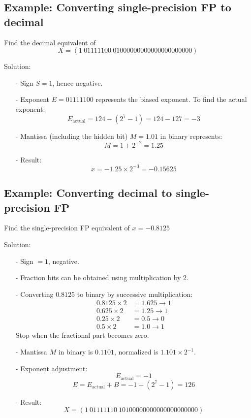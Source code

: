 \documentclass[12pt,openany, tikz,border=10pt]{book}
\begin{document}
\subsection*{Example: Converting single-precision FP to decimal}

Find the decimal equivalent of
\[ X = (1\ 01111100\ 01000000000000000000000) \]

Solution:
\begin{itemize}
    \item[-] Sign \( S = 1 \), hence negative.
    \item[-] Exponent \( E = 01111100 \) represents the biased exponent. To find the actual exponent:
    \[ E_{\text{actual}} = 124 - (2^7 - 1) = 124 - 127 = -3 \]
    \item[-] Mantissa (including the hidden bit) \( M = 1.01 \) in binary represents:
    \[ M = 1 + 2^{-2} = 1.25 \]
    \item[-] Result:
    \[ x = -1.25 \times 2^{-3} = -0.15625 \]
\end{itemize}

\subsection*{Example: Converting decimal to single-precision FP}

Find the single-precision FP equivalent of \( x = -0.8125 \)

Solution:
\begin{itemize}
    \item[-] Sign \( = 1 \), negative.
    \item[-] Fraction bits can be obtained using multiplication by 2.
    \item[-] Converting \( 0.8125 \) to binary by successive multiplication:
    \begin{align*}
        0.8125 \times 2 &= 1.625 \rightarrow 1 \\
        0.625 \times 2 &= 1.25 \rightarrow 1 \\
        0.25 \times 2 &= 0.5 \rightarrow 0 \\
        0.5 \times 2 &= 1.0 \rightarrow 1
    \end{align*}
    Stop when the fractional part becomes zero.
    \item[-] Mantissa \( M \) in binary is \( 0.1101 \), normalized is \( 1.101 \times 2^{-1} \).
    \item[-] Exponent adjustment:
    \[ E_{\text{actual}} = -1 \]
    \[ E = E_{\text{actual}} + B = -1 + (2^7 - 1) = 126 \]
    \item[-] Result:
    \[ X = (1\ 01111110\ 10100000000000000000000) \]
\end{itemize}
\end{document}
